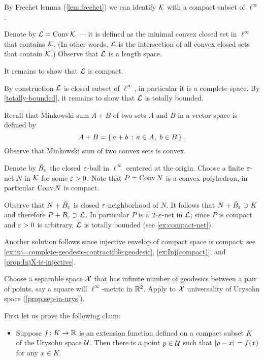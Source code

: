 




 By Frechet lemma (\ref{lem:frechet}) we can identify $\mathcal{K}$ with a compact subset of $\ell^\infty$.

Denote by $\mathcal{L}=\mathop{\rm Conv}\nolimits\mathcal{K}$ --- it is defined as the minimal convex closed set in $\ell^\infty$ that contains $\mathcal{K}$.
(In other words, $\mathcal{L}$ is the intersection of all convex closed sets that contain $\mathcal{K}$.)
Observe that $\mathcal{L}$ is a length space.

It remains to show that $\mathcal{L}$ is compact.

By construction $\mathcal{L}$ is closed subset of $\ell^\infty$, in particular it is a complete space.
By \ref{totally-bounded}, it remains to show that $\mathcal{L}$ is totally bounded.

Recall that Minkowski sum $A + B$ of two sets $A$ and $B$ in a vector space is defined by
\[A + B = \left\{\,{a+b}\,:\,{a\in A,\ b\in B}\,\right\}.\]
Observe that Minkowski sum of two convex sets is convex.

Denote by $\bar B_\varepsilon$ the closed $\varepsilon$-ball in $\ell^\infty$ centered at the origin.
Choose a finite $\varepsilon$-net $N$ in $\mathcal{K}$ for some $\varepsilon>0$.
Note that $P=\mathop{\rm Conv}\nolimits N$ is a convex polyhedron, in particular $\mathop{\rm Conv}\nolimits N$ is compact.

Observe that $N+\bar B_\varepsilon$ is closed $\varepsilon$-neighborhood of $N$.
It follows that $N+\bar B_\varepsilon\supset K$ and therefore $P+\bar B_\varepsilon\supset \mathcal{L}$.
In particular $P$ is a $2\cdot\eps$-net in $\mathcal{L}$;
since $P$ is compact and $\varepsilon>0$ is arbitrary, $\mathcal{L}$ is totally bounded (see \ref{ex:compact-net}).

Another solution follows since injective envelop of compact space is compact; see \ref{ex:inj=complete-geodesic-contractible:geodesic}, \ref{ex:Inj(compact)}, and \ref{prop:InjX-is-injective}.

Choose a separable space $\mathcal{X}$ that has infinite number of geodesics between a pair of points, say a square will $\ell^\infty$-metric in $\mathbb{R}^2$.
Apply to $\mathcal{X}$ universality of Urysohn space (\ref{prop:sep-in-urys}).

First let us prove the following claim:

\begin{itemize}
\item 
Suppose $f\colon K\to\mathbb{R}$ is an extension function defined on a compact subset $K$ of the Urysohn space $\mathcal{U}$.
Then there is a point $p\in \mathcal{U}$ such that 
$\dist{p}{x}{}=f(x)$ for any $x\in K$.
\end{itemize}

